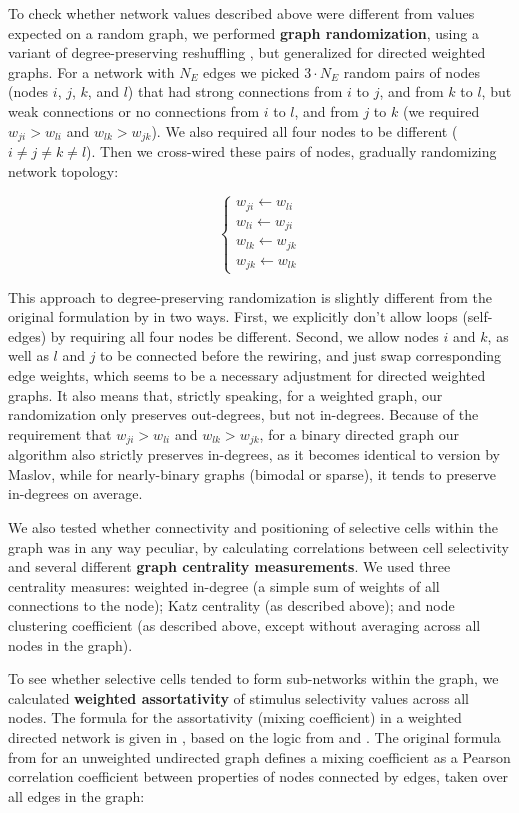 \documentclass{article}
\begin{document}
To check whether network values described above were different from values expected on a random graph, we performed \textbf{graph randomization}, using a variant of degree-preserving reshuffling \citep{maslov2002}, but generalized for directed weighted graphs. For a network with $N_E$ edges we picked $3\cdot N_E$ random pairs of nodes (nodes $i$, $j$, $k$, and $l$) that had strong connections from $i$ to $j$, and from $k$ to $l$, but weak connections or no connections from $i$ to $l$, and from $j$ to $k$ (we required $w_{ji}>w_{li}$ and $w_{lk}>w_{jk}$). We also required all four nodes to be different ($i \neq j \neq k \neq l$). Then we cross-wired these pairs of nodes, gradually randomizing network topology:

\[ \left \{ \begin{array}{l}  
w_{ji} \leftarrow w_{li} \\ 
w_{li} \leftarrow w_{ji} \\
w_{lk} \leftarrow w_{jk} \\
w_{jk} \leftarrow w_{lk}
\end{array} \right. \]

This approach to degree-preserving randomization is slightly different from the original formulation by \citep{maslov2002} in two ways. First, we explicitly don’t allow loops (self-edges) by requiring all four nodes be different. Second, we allow nodes $i$ and $k$, as well as $l$ and $j$ to be connected before the rewiring, and just swap corresponding edge weights, which seems to be a necessary adjustment for directed weighted graphs. It also means that, strictly speaking, for a weighted graph, our randomization only preserves out-degrees, but not in-degrees. Because of the requirement that $w_{ji}>w_{li}$ and $w_{lk}>w_{jk}$, for a binary directed graph our algorithm also strictly preserves in-degrees, as it becomes identical to version by Maslov, while for nearly-binary graphs (bimodal or sparse), it tends to preserve in-degrees on average.

We also tested whether connectivity and positioning of selective cells within the graph was in any way peculiar, by calculating correlations between cell selectivity and several different \textbf{graph centrality measurements}. We used three centrality measures: weighted in-degree (a simple sum of weights of all connections to the node); Katz centrality (as described above); and node clustering coefficient (as described above, except without averaging across all nodes in the graph).

To see whether selective cells tended to form sub-networks within the graph, we calculated \textbf{weighted assortativity} of stimulus selectivity values across all nodes. The formula for the assortativity (mixing coefficient) in a weighted directed network is given in \citep{farine2014weighted}, based on the logic from \citep{newman2003mixing} and \citep{leung2007weighted}. The original formula from \citep{newman2003mixing} for an unweighted undirected graph defines a mixing coefficient as a Pearson correlation coefficient between properties of nodes connected by edges, taken over all edges in the graph:
\end{document}
